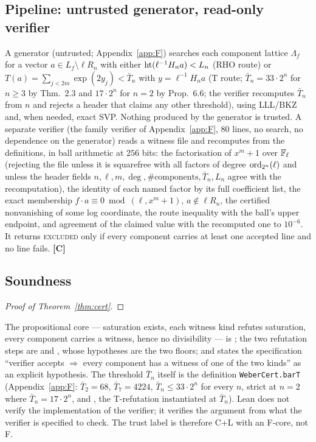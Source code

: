 \documentclass[11pt]{amsart}
\theoremstyle{remark}\newtheorem{remark}[theorem]{Remark}
\theoremstyle{definition}\newtheorem{definition}[theorem]{Definition}
\newcommand{\lbl}[1]{\textbf{[#1]}}\newcommand{\barT}{\bar T_n}
\providecommand{\proofsdir}{../../proofs} %
\begin{document}
\subsection{Pipeline: untrusted generator, read-only verifier}
A generator (untrusted; Appendix~\ref{app:F}) searches each component lattice $\Lambda_f$ for a vector $a\in L_f\setminus\ell R_n$ with either $\operatorname{ht}(\ell^{-1}H_na)<L_n$ (RHO route) or $T(a)=\sum_{j<2m}\exp(2y_j)<\barT$ with $y=\ell^{-1}H_na$ (T route; $\barT=33\cdot2^n$ for $n\ge3$ by \cite{KY} Thm.~2.3 and $17\cdot2^n$ for $n=2$ by \cite{MO3} Prop.~6.6; the verifier recomputes $\barT$ from $n$ and rejects a header that claims any other threshold), using LLL/BKZ and, when needed, exact SVP. Nothing produced by the generator is trusted. A separate verifier (the family verifier of Appendix~\ref{app:F}, $80$ lines, no search, no dependence on the generator) reads a witness file and recomputes from the definitions, in ball arithmetic at $256$ bits: the factorisation of $x^m+1$ over $\mathbb{F}_\ell$ (rejecting the file unless it is squarefree with all factors of degree $\operatorname{ord}_{2^n}(\ell)$ and unless the header fields $n,\ell,m,\deg,\#\text{components},\barT,L_n$ agree with the recomputation), the identity of each named factor by its full coefficient list, the exact membership $f\cdot a\equiv0\bmod(\ell,x^m+1)$, $a\notin\ell R_n$, the certified nonvanishing of some log coordinate, the route inequality with the ball's upper endpoint, and agreement of the claimed value with the recomputed one to $10^{-6}$. It returns \textsc{excluded} only if every component carries at least one accepted line and no line fails. \lbl{C}
\subsection{Soundness}
\begin{proof}[Proof of Theorem~\ref{thm:cert}]

\end{proof}
The propositional core --- saturation exists, each witness kind refutes saturation, every component carries a witness, hence no divisibility --- is ; the two refutation steps are  and , whose hypotheses are the two floors; and  states the specification ``verifier accepts $\Rightarrow$ every component has a witness of one of the two kinds'' as an explicit hypothesis. The threshold $\barT$ itself is the definition \texttt{WeberCert.barT} (Appendix~\ref{app:F}: $\bar T_2=68$, $\bar T_7=4224$, $\barT\le33\cdot2^n$ for every $n$, strict at $n=2$ where $\barT=17\cdot2^n$, and , the T-refutation instantiated at $\barT$). Lean does not verify the implementation of the verifier; it verifies the argument from what the verifier is specified to check. The trust label is therefore C+L with an F-core, not F.
\end{document}
